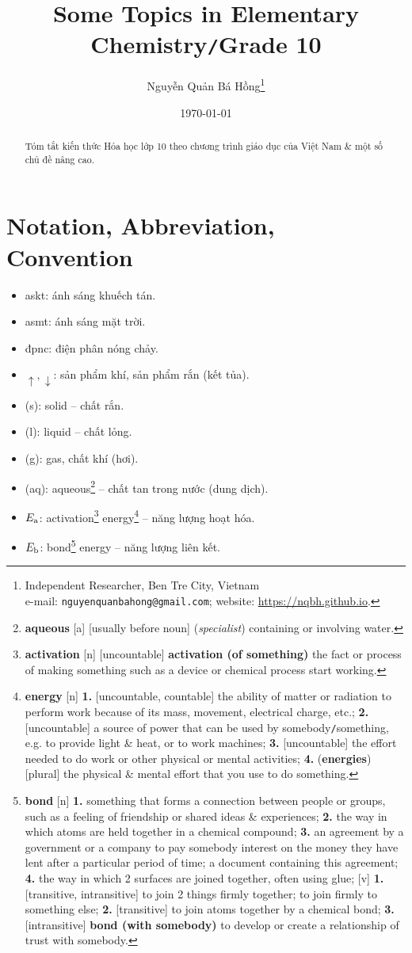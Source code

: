 \documentclass{article}
\title{Some Topics in Elementary Chemistry\texttt{/}Grade 10}
\author{Nguyễn Quản Bá Hồng\footnote{Independent Researcher, Ben Tre City, Vietnam\\e-mail: \texttt{nguyenquanbahong@gmail.com}; website: \url{https://nqbh.github.io}.}}
\date{\today}
\numberwithin{equation}{section}
\begin{document}
\maketitle
\begin{abstract}
	Tóm tắt kiến thức Hóa học lớp 10 theo chương trình giáo dục của Việt Nam \& một số chủ đề nâng cao.
\end{abstract}
\setcounter{secnumdepth}{4}
\setcounter{tocdepth}{3}
\tableofcontents
\newpage


\section*{Notation, Abbreviation, Convention}
\begin{itemize}
	\item askt: ánh sáng khuếch tán.
	\item asmt: ánh sáng mặt trời.
	\item đpnc: điện phân nóng chảy.
	\item $\uparrow,\downarrow$: sản phẩm khí, sản phẩm rắn (kết tủa).
	\item (s): solid -- chất rắn.
	\item (l): liquid -- chất lỏng.
	\item (g): gas, chất khí (hơi).
	\item (aq): aqueous\footnote{\textbf{aqueous} [a] [usually before noun] (\textit{specialist}) containing or involving water.} -- chất tan trong nước (dung dịch).
	\item $E_{\rm a}$: activation\footnote{\textbf{activation} [n] [uncountable] \textbf{activation (of something)} the fact or process of making something such as a device or chemical process start working.} energy\footnote{\textbf{energy} [n] \textbf{1.} [uncountable, countable] the ability of matter or radiation to perform work because of its mass, movement, electrical charge, etc.; \textbf{2.} [uncountable] a source of power that can be used by somebody\texttt{/}something, e.g. to provide light \& heat, or to work machines; \textbf{3.} [uncountable] the effort needed to do work or other physical or mental activities; \textbf{4.} (\textbf{energies}) [plural] the physical \& mental effort that you use to do something.} -- năng lượng hoạt hóa.
	\item $E_{\rm b}$: bond\footnote{\textbf{bond} [n] \textbf{1.} something that forms a connection between people or groups, such as a feeling of friendship or shared ideas \& experiences; \textbf{2.} the way in which atoms are held together in a chemical compound; \textbf{3.} an agreement by a government or a company to pay somebody interest on the money they have lent after a particular period of time; a document containing this agreement; \textbf{4.} the way in which 2 surfaces are joined together, often using glue; [v] \textbf{1.} [transitive, intransitive] to join 2 things firmly together; to join firmly to something else; \textbf{2.} [transitive] to join atoms together by a chemical bond; \textbf{3.} [intransitive] \textbf{bond (with somebody)} to develop or create a relationship of trust with somebody.} energy -- năng lượng liên kết.

\end{itemize}
\end{document}

